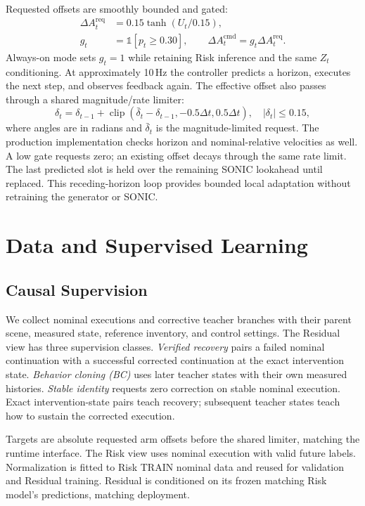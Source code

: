 \documentclass[letterpaper,10pt,conference]{ieeeconf}
\begin{document}
Requested offsets are smoothly bounded and gated:
\begin{align}
 \Delta A_t^{\mathrm{req}}&=0.15\tanh(U_t/0.15),\\
 g_t&=\mathbb{1}[p_t\geq0.30],\qquad
 \Delta A_t^{\mathrm{cmd}}=g_t\Delta A_t^{\mathrm{req}}.
\end{align}
Always-on mode sets $g_t=1$ while retaining Risk inference and the same $Z_t$ conditioning. At approximately 10\,Hz the controller predicts a horizon, executes the next step, and observes feedback again. The effective offset also passes through a shared magnitude/rate limiter:
\begin{equation}
 \delta_t=\delta_{t-1}+\operatorname{clip}
 (\bar{\delta}_t-\delta_{t-1},-0.5\Delta t,0.5\Delta t),
 \quad |\delta_t|\leq0.15,
 \label{eq:limiter}
\end{equation}
where angles are in radians and $\bar{\delta}_t$ is the magnitude-limited request. The production implementation checks horizon and nominal-relative velocities as well. A low gate requests zero; an existing offset decays through the same rate limit. The last predicted slot is held over the remaining SONIC lookahead until replaced. This receding-horizon loop provides bounded local adaptation without retraining the generator or SONIC.

\section{Data and Supervised Learning}
\subsection{Causal Supervision}
We collect nominal executions and corrective teacher branches with their parent scene, measured state, reference inventory, and control settings. The Residual view has three supervision classes. \emph{Verified recovery} pairs a failed nominal continuation with a successful corrected continuation at the exact intervention state. \emph{Behavior cloning (BC)} uses later teacher states with their own measured histories. \emph{Stable identity} requests zero correction on stable nominal execution. Exact intervention-state pairs teach recovery; subsequent teacher states teach how to sustain the corrected execution.

Targets are absolute requested arm offsets before the shared limiter, matching the runtime interface. The Risk view uses nominal execution with valid future labels. Normalization is fitted to Risk TRAIN nominal data and reused for validation and Residual training. Residual is conditioned on its frozen matching Risk model's predictions, matching deployment.
\end{document}
